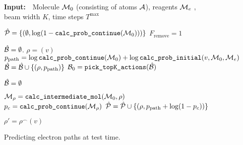 

\newcommand{\cProbCont}{\texttt{calc\_prob\_continue}}
\newcommand{\cProbAct}{\texttt{calc\_prob\_action}}
\newcommand{\cProbInitial}{\texttt{calc\_prob\_initial}}
\newcommand{\removeFlag}{F_\textrm{remove}}

\newcommand{\outputPool}{\hat{\Pc}}
\newcommand{\cPath}{\rho}
\newcommand{\lProb}{p_{\textrm{path}}}


\begin{figure}
\begin{minipage}{1.\textwidth}
\begin{algorithm}[H]
  \caption{Predicting electron paths at test time.}
  \label{alg:beam_search}
  {\bf Input:}~~Molecule ${\mathcal{M}}_0$ (consisting of atoms ${\mathcal{A}}$), reagents ${\mathcal{M}}_e$ , beam width $K$, time steps $T^\mathrm{max}$
  
  \begin{algorithmic}[1]
  	\STATE $\outputPool = \{\left( \emptyset, \log (1 - \cProbCont(\Mc_0)) \right) \}$  
  	\STATE $\removeFlag \!=\!1$ 
  	
  	\STATE
	\STATE $\hat{{\mathcal{B}}} = \emptyset$.  	
		\STATE $ \cPath = (v)$
		\STATE $ \lProb = \log \cProbCont(\Mc_0) + \log \cProbInitial(v, \moleculeSet_0, \moleculeSet_e)$
		\STATE $\hat{\Bc} = \hat{\Bc} \cup \{\left(\cPath, \lProb \right)\}$
	\ENDFOR
	\STATE  ${\mathcal{B}}_{0} = \texttt{pick\_topK\_actions}(\hat{{\mathcal{B}}})$ 
	
	\STATE
		\STATE $\hat{{\mathcal{B}}} = \emptyset $ 
				
		\FORALL{$(\cPath, \lProb) \in \Bc_{t-1}$} 
			
			\STATE $\Mc_\cPath = \texttt{calc\_intermediate\_mol}(\Mc_0, \cPath)$
			\STATE $p_c = \cProbCont(\Mc_\cPath)$
			\STATE $\hat{\Pc} = \hat{\Pc} \cup \{(\cPath, \lProb + \log (1 - p_c))\}$
			
				\STATE $\cPath' = \cPath^\frown (v)$ 


\end{algorithmic}
\end{algorithm}
\end{minipage}
\end{figure}
